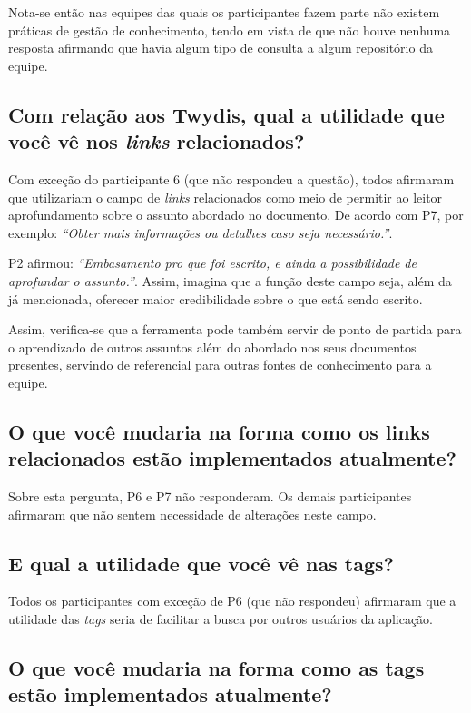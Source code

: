 Nota-se então nas equipes das quais os participantes fazem parte não existem práticas de gestão de conhecimento, tendo em vista de que não houve nenhuma resposta afirmando que havia algum tipo de consulta a algum repositório da equipe.

\subsection{Com relação aos Twydis, qual a utilidade que você vê nos \textit{links} relacionados?}

Com exceção do participante 6 (que não respondeu a questão), todos afirmaram que utilizariam o campo de \textit{links} relacionados como meio de permitir ao leitor aprofundamento sobre o assunto abordado no documento. De acordo com P7, por exemplo: \textit{``Obter mais informações ou detalhes caso seja necessário.''}.

P2 afirmou: \textit{``Embasamento pro que foi escrito, e ainda a possibilidade de aprofundar o assunto.''}. Assim, imagina que a função deste campo seja, além da já mencionada, oferecer maior credibilidade sobre o que está sendo escrito.

Assim, verifica-se que a ferramenta pode também servir de ponto de partida para o aprendizado de outros assuntos além do abordado nos seus documentos presentes, servindo de referencial para outras fontes de conhecimento para a equipe.

\subsection{O que você mudaria na forma como os links relacionados estão implementados atualmente?}

Sobre esta pergunta, P6 e P7 não responderam. Os demais participantes afirmaram que não sentem necessidade de alterações neste campo.

\subsection{E qual a utilidade que você vê nas tags?}

Todos os participantes com exceção de P6 (que não respondeu) afirmaram que a utilidade das \textit{tags} seria de facilitar a busca por outros usuários da aplicação.

\subsection{O que você mudaria na forma como as tags estão implementados atualmente?}
\label{sec:mudaria-tags}

